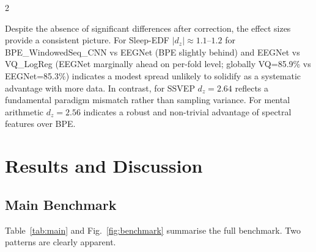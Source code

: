 \documentclass[14pt,a4paper]{extarticle}
\begin{document}
\begin{multicols}{2}

Despite the absence of significant differences after correction,
the effect sizes provide a consistent picture.
For Sleep-EDF $|d_z| \approx 1.1$--$1.2$ for BPE\_WindowedSeq\_CNN
vs EEGNet (BPE slightly behind) and EEGNet vs VQ\_LogReg
(EEGNet marginally ahead on per-fold level; globally VQ=85.9\%
vs EEGNet=85.3\%) indicates a modest spread unlikely to
solidify as a systematic advantage with more data.
In contrast, for SSVEP $d_z = 2.64$ reflects a fundamental
paradigm mismatch rather than sampling variance.
For mental arithmetic $d_z = 2.56$ indicates a robust and
non-trivial advantage of spectral features over BPE.

\section*{Results and Discussion}

\subsection*{Main Benchmark}

Table~\ref{tab:main} and Fig.~\ref{fig:benchmark} summarise
the full benchmark.
Two patterns are clearly apparent.

\end{multicols}
\end{document}
